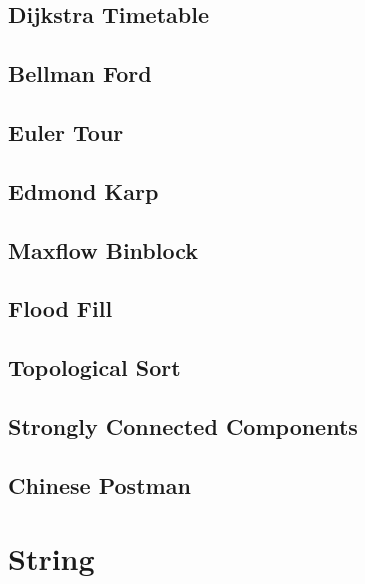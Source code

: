 \documentclass[a4paper,landscape,8pt]{article}
\begin{document}
\begin{multicols}{2}
\subsection{Dijkstra Timetable}


\subsection{Bellman Ford}


\subsection{Euler Tour}


\subsection{Edmond Karp}


\subsection{Maxflow Binblock}


\subsection{Flood Fill}


\subsection{Topological Sort}


\subsection{Strongly Connected Components}


\subsection{Chinese Postman}



\section{String}


\end{multicols}
\end{document}
